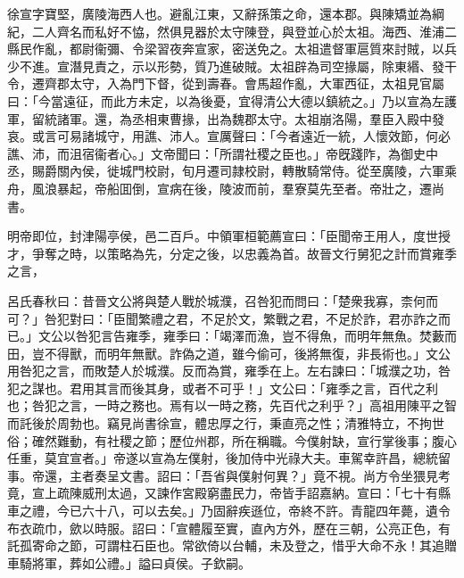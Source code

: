 
\begin{pinyinscope}
徐宣字寶堅，廣陵海西人也。避亂江東，又辭孫策之命，還本郡。與陳矯並為綱紀，二人齊名而私好不恊，然俱見器於太守陳登，與登並心於太祖。海西、淮浦二縣民作亂，都尉衞彌、令梁習夜奔宣家，密送免之。太祖遣督軍扈質來討賊，以兵少不進。宣潛見責之，示以形勢，質乃進破賊。太祖辟為司空掾屬，除東緡、發干令，遷齊郡太守，入為門下督，從到壽春。會馬超作亂，大軍西征，太祖見官屬曰：「今當遠征，而此方未定，以為後憂，宜得清公大德以鎮統之。」乃以宣為左護軍，留統諸軍。還，為丞相東曹掾，出為魏郡太守。太祖崩洛陽，羣臣入殿中發哀。或言可易諸城守，用譙、沛人。宣厲聲曰：「今者遠近一統，人懷效節，何必譙、沛，而沮宿衞者心。」文帝聞曰：「所謂社稷之臣也。」帝旣踐阼，為御史中丞，賜爵關內侯，徙城門校尉，旬月遷司隷校尉，轉散騎常侍。從至廣陵，六軍乘舟，風浪暴起，帝船囬倒，宣病在後，陵波而前，羣寮莫先至者。帝壯之，遷尚書。

明帝即位，封津陽亭侯，邑二百戶。中領軍桓範薦宣曰：「臣聞帝王用人，度世授才，爭奪之時，以策略為先，分定之後，以忠義為首。故晉文行舅犯之計而賞雍季之言，

呂氏春秋曰：昔晉文公將與楚人戰於城濮，召咎犯而問曰：「楚衆我寡，柰何而可？」咎犯對曰：「臣聞繁禮之君，不足於文，繁戰之君，不足於詐，君亦詐之而已。」文公以咎犯言告雍季，雍季曰：「竭澤而漁，豈不得魚，而明年無魚。焚藪而田，豈不得獸，而明年無獸。詐偽之道，雖今偷可，後將無復，非長術也。」文公用咎犯之言，而敗楚人於城濮。反而為賞，雍季在上。左右諫曰：「城濮之功，咎犯之謀也。君用其言而後其身，或者不可乎！」文公曰：「雍季之言，百代之利也；咎犯之言，一時之務也。焉有以一時之務，先百代之利乎？」高祖用陳平之智而託後於周勃也。竊見尚書徐宣，體忠厚之行，秉直亮之性；清雅特立，不拘世俗；確然難動，有社稷之節；歷位州郡，所在稱職。今僕射缺，宣行掌後事；腹心任重，莫宜宣者。」帝遂以宣為左僕射，後加侍中光祿大夫。車駕幸許昌，總統留事。帝還，主者奏呈文書。詔曰：「吾省與僕射何異？」竟不視。尚方令坐猥見考竟，宣上疏陳威刑太過，又諫作宮殿窮盡民力，帝皆手詔嘉納。宣曰：「七十有縣車之禮，今已六十八，可以去矣。」乃固辭疾遜位，帝終不許。青龍四年薨，遺令布衣疏巾，歛以時服。詔曰：「宣體履至實，直內方外，歷在三朝，公亮正色，有託孤寄命之節，可謂柱石臣也。常欲倚以台輔，未及登之，惜乎大命不永！其追贈車騎將軍，葬如公禮。」謚曰貞侯。子欽嗣。


\end{pinyinscope}